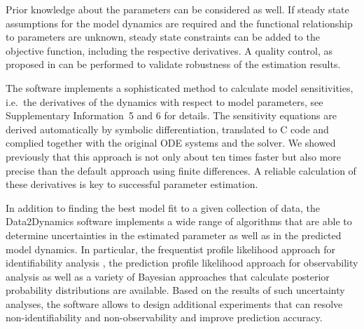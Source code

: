 \documentclass{bioinfo}
\begin{document}
Prior knowledge about the parameters can be considered as well. 
If steady state assumptions %
for the model dynamics are required and the functional relationship to parameters are unknown, %
steady state constraints can be added to the objective function, including the respective derivatives. A quality control, as proposed in \citet{Raue:2012zt} can be performed to validate robustness of the estimation results.

The software implements a sophisticated method to calculate model sensitivities, i.e.~the derivatives of the dynamics with respect to model parameters, see Supplementary Information~5 and 6 for details. The sensitivity equations are derived automatically by symbolic differentiation, translated to C code and complied together with the original ODE systems and the solver. We showed previously \citep{Raue:2012zt} that this approach is not only about ten times faster but also more precise than the default approach using finite differences. A reliable calculation of these derivatives is key to successful parameter estimation. 

In addition to finding the best model fit to a given collection of data, the Data2Dynamics software implements a wide range of algorithms that are able to determine uncertainties in the estimated parameter as well as in the predicted model dynamics. In particular, the frequentist profile likelihood approach for identifiability analysis \citep{Raue:2009ec}, the prediction profile likelihood approach for observability analysis \citep{Kreutz:2011kx} as well as a variety of Bayesian approaches \citep{Raue:2013fk, Hug:2012fk} that calculate posterior probability distributions are available. Based on the results of such uncertainty analyses, the software allows to design additional experiments \citep{Steiert:2012fk} that can resolve non-identifiability and non-observability \citep{Raue:2010fk, Kreutz:2013uq} and improve prediction accuracy.

\end{document}
